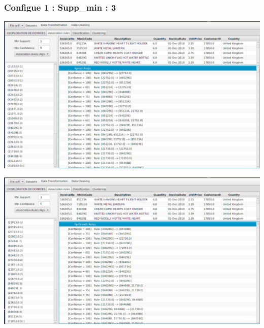 \documentclass[12pt,a4paper,oneside]{book}
\begin{document}
	\subsubsection*{Configue 1 : Supp\_min : 3 }
	\begin{frame}{}
		\centering
		\begin{minipage}[b]{0.5\linewidth}
			\includegraphics[width=1\textwidth]{images/apriori_supp3.png}%
			\label{labelname}%
		\end{minipage}
		\hspace{0.5cm}
		\begin{minipage}[b]{0.5\linewidth}
			\includegraphics[width=1\textwidth]{images/fpg_supp3.png}%
			\label{labelname}%
		\end{minipage}
	\end{frame}
	
\end{document}
